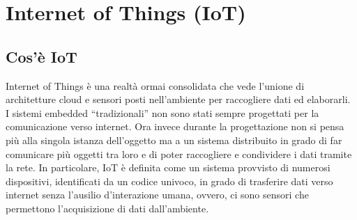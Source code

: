 \documentclass[10pt,a4paper,oneside]{scrbook}
\begin{document}
\chapter{Internet of Things (IoT)}
\section{Cos'è IoT}
Internet of Things è una realtà ormai consolidata che vede l'unione di architetture cloud e sensori posti nell'ambiente per raccogliere dati ed elaborarli.
I sistemi embedded ``tradizionali'' non sono stati sempre progettati per la comunicazione verso internet. Ora invece durante la progettazione non si pensa
più alla singola istanza dell'oggetto ma a un sistema distribuito in grado di far comunicare più oggetti tra loro e di poter raccogliere e condividere
i dati tramite la rete.
In particolare, IoT è definita come un sistema provvisto di numerosi dispositivi, identificati da un codice univoco, in grado di trasferire dati verso
internet senza l'ausilio d'interazione umana, ovvero, ci sono sensori che permettono l'acquisizione di dati dall'ambiente.
\end{document}
